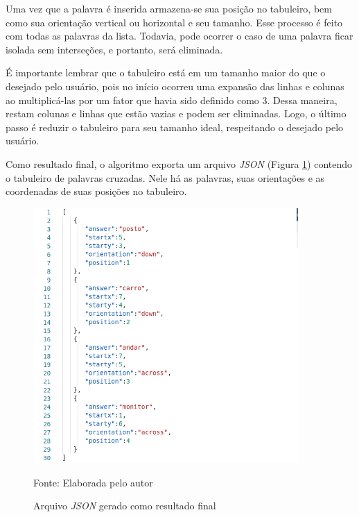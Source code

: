 Uma vez que a palavra é inserida armazena-se sua posição no tabuleiro, bem como sua orientação vertical ou horizontal e seu tamanho. Esse processo é feito com todas as palavras da lista. Todavia, pode ocorrer o caso de uma palavra ficar isolada sem interseções, e portanto, será eliminada. 

É importante lembrar que o tabuleiro está em um tamanho maior do que o desejado pelo usuário, pois no início ocorreu uma expansão das linhas e colunas ao multiplicá-las por um fator que havia sido definido como 3. Dessa maneira, restam colunas e linhas que estão vazias e podem ser eliminadas. Logo, o último passo é reduzir o tabuleiro para seu tamanho ideal, respeitando o desejado pelo usuário. 

Como resultado final, o algoritmo exporta um arquivo \textit{JSON} (Figura \ref{fig:json}) contendo o tabuleiro de palavras cruzadas. Nele há as palavras, suas orientações e as coordenadas de suas posições no tabuleiro.

\begin{figure}[H]
\centering
    \caption{Arquivo \textit{JSON} gerado como resultado final}
    \label{fig:json}
    \includegraphics[width=0.9\textwidth]{Figuras/codeJSONresult.png}
    
    Fonte: Elaborada pelo autor
\end{figure}

